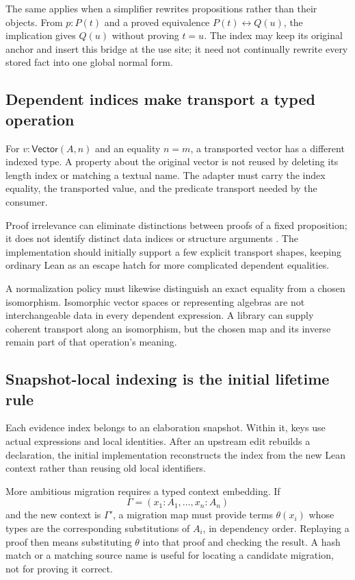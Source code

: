 \documentclass[11pt,a4paper]{article}
\theoremstyle{definition}
\theoremstyle{remark}
\begin{document}
The same applies when a simplifier rewrites propositions rather than their
objects. From $p:P(t)$ and a proved equivalence $P(t)\leftrightarrow Q(u)$,
the implication gives $Q(u)$ without proving $t=u$. The index may keep its
original anchor and insert this bridge at the use site; it need not continually
rewrite every stored fact into one global normal form.

\subsection{Dependent indices make transport a typed operation}

For $v:\mathsf{Vector}(A,n)$ and an equality $n=m$, a transported vector has
a different indexed type. A property about the original vector is not reused
by deleting its length index or matching a textual name. The adapter must
carry the index equality, the transported value, and the predicate transport
needed by the consumer.

Proof irrelevance can eliminate distinctions between proofs of a fixed
proposition; it does not identify distinct data indices or structure arguments
\cite{lean-propositions}. The implementation should initially support a few
explicit transport shapes, keeping ordinary Lean as an escape hatch for
more complicated dependent equalities.

A normalization policy must likewise distinguish an exact equality from a
chosen isomorphism. Isomorphic vector spaces or representing algebras are not
interchangeable data in every dependent expression. A library can supply
coherent transport along an isomorphism, but the chosen map and its inverse
remain part of that operation's meaning.

\subsection{Snapshot-local indexing is the initial lifetime rule}

Each evidence index belongs to an elaboration snapshot. Within it, keys use
actual expressions and local identities. After an upstream edit rebuilds a
declaration, the initial implementation reconstructs the index from the new
Lean context rather than reusing old local identifiers.

More ambitious migration requires a typed context embedding. If
\[
 \Gamma=(x_1:A_1,\ldots,x_n:A_n)
\]
and the new context is $\Gamma'$, a migration map must provide terms
$\theta(x_i)$ whose types are the corresponding substitutions of $A_i$,
in dependency order. Replaying a proof then means substituting $\theta$ into
that proof and checking the result. A hash match or a matching source name is
useful for locating a candidate migration, not for proving it correct.
\end{document}
